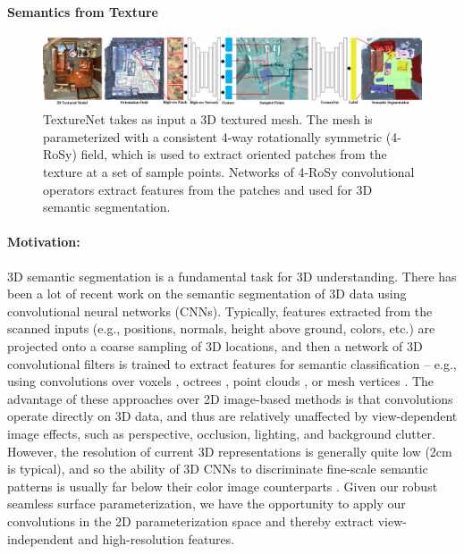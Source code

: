 \paragraph*{Semantics from Texture}
\begin{figure}
    \begin{center}
        \includegraphics[width=\linewidth]{texturenet/teaser/teaser.pdf}
        \caption{TextureNet takes as input a 3D textured mesh.  The mesh is parameterized with a consistent 4-way rotationally symmetric (4-RoSy) field, which is used to extract oriented patches from the texture at a set of sample points.   Networks of 4-RoSy convolutional operators extract features from the patches and used for 3D semantic segmentation.}
        \label{fig:texturenet-teaser}
    \end{center}    
\end{figure}
\label{intro:texture-learn}

\paragraph*{Motivation:} 3D semantic segmentation is a fundamental task for 3D understanding. There has been a lot of recent work on the semantic segmentation of 3D data using convolutional neural networks (CNNs).  Typically, features extracted from the scanned inputs (e.g., positions, normals, height above ground, colors, etc.) are projected onto a coarse sampling of 3D locations, and then a network of 3D convolutional filters is trained to extract features for semantic classification -- e.g., using convolutions over voxels \cite{wu20153d,maturana2015voxnet,qi2016volumetric,song2017semantic,dai2017scannet,dai2018scancomplete}, octrees \cite{riegler2017octnet}, point clouds \cite{qi2017pointnet,qi2017pointnet++}, or mesh vertices \cite{masci2015geodesic}.  The advantage of these approaches over 2D image-based methods is that convolutions operate directly on 3D data, and thus are relatively unaffected by view-dependent image effects, such as perspective, occlusion, lighting, and background clutter.   However, the resolution of current 3D representations is generally quite low (2cm is typical), and so the ability of 3D CNNs to discriminate fine-scale semantic patterns is usually far below their color image counterparts \cite{long2015fully,he2017mask}. Given our robust seamless surface parameterization, we have the opportunity to apply our convolutions in the 2D parameterization space and thereby extract view-independent and high-resolution features.


